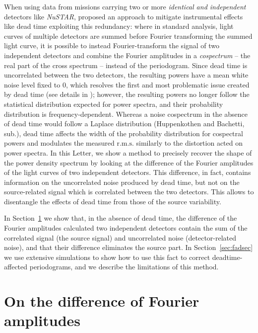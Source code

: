 \documentclass[twocolumn]{aastex61}
\newcommand{\project}[1]{\textsl{#1}}
\newcommand{\nustar}{\project{NuSTAR}\xspace}
\newcommand{\sref}{Section~\ref}
\newcommand{\rms}{\ensuremath{\mathrm{r.m.s.}}\xspace}
\begin{document}
When using data from missions carrying two or more \textit{identical and independent} detectors like \nustar, \citet{Bachetti+15} proposed an approach to mitigate instrumental effects like dead time exploiting this redundancy: 
where in standard analysis, light curves of multiple detectors are summed before Fourier transforming the summed light curve, 
it is possible to instead Fourier-transform the signal of two independent detectors and combine the Fourier amplitudes in a \textit{cospectrum} -- the real part of the cross spectrum -- instead of the periodogram. 
Since dead time is uncorrelated between the two detectors, the resulting powers have a mean white noise level fixed to 0, which resolves the first and most problematic issue created by dead time (see details in \citealt{Bachetti+15}); however, the resulting powers no longer follow the statistical distribution expected for power spectra, and their probability distribution is frequency-dependent.
Whereas a noise cospectrum in the absence of dead time would follow a Laplace distribution (Huppenkothen and Bachetti, sub.),
dead time affects the width of the probability distribution for cospectral powers and modulates the measured \rms similarly to the distortion acted on power spectra.
In this Letter, we show a method to precisely recover the shape of the power density spectrum by looking at the difference of the Fourier amplitudes of the light curves of two independent detectors.
This difference, in fact, contains information on the uncorrelated noise produced by dead time, but not on the source-related  signal which is correlated between the two detectors.
This allows to disentangle the effects of dead time from those of the source variability.

In \sref{sec:fourierdiff} we show that, in the absence of dead time, the difference of the Fourier amplitudes calculated  two independent detectors contain the sum of the correlated signal (the source signal) and uncorrelated noise (detector-related noise), and that their difference eliminates the source part. 
In \sref{sec:fadsec} we use extensive simulations to show how to use this fact to correct deadtime-affected periodograms, and we describe the limitations of this method.


\section{On the difference of Fourier amplitudes} \label{sec:fourierdiff}
\end{document}
